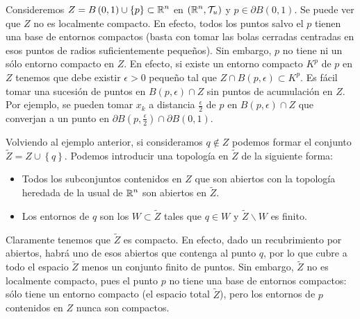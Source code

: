 \begin{eg}
	Consideremos $\displaystyle Z = B\left(0,1\right)\cup \left\{ p\right\}\subset \mathbb{R}^{n} $ en $\displaystyle \left(\mathbb{R}^{n}, \mathcal{T}_{u}\right) $ y $\displaystyle p \in \partial B\left(0,1\right) $. Se puede ver que $\displaystyle Z $ no es localmente compacto. En efecto, todos los puntos salvo el $\displaystyle p $ tienen una base de entornos compactos (basta con tomar las bolas cerradas centradas en esos puntos de radios suficientemente pequeños). Sin embargo, $\displaystyle p $ no tiene ni un sólo entorno compacto en $\displaystyle Z $. En efecto, si existe un entorno compacto $\displaystyle K^{p} $ de $\displaystyle p $ en $\displaystyle Z $ tenemos que debe existir $\displaystyle \epsilon > 0 $ pequeño tal que $\displaystyle Z \cap B\left(p,\epsilon \right)\subset K^{p} $. 
	Es fácil tomar una sucesión de puntos en $\displaystyle B\left(p, \epsilon \right)\cap Z $ sin puntos de acumulación en $\displaystyle Z $. Por ejemplo, se pueden tomar $\displaystyle x_{k} $ a distancia $\displaystyle \frac{\epsilon }{2} $ de $\displaystyle p $ en $\displaystyle B\left(p, \epsilon \right)\cap Z $ que converjan a un punto en $\displaystyle \partial B\left(p, \frac{\epsilon }{2}\right)\cap \partial B\left(0,1\right) $. 
\end{eg}
\begin{eg}
	Volviendo al ejemplo anterior, si consideramos $\displaystyle q \not\in Z $ podemos formar el conjunto $\displaystyle \tilde{Z} = Z \cup \left\{ q\right\}  $. Podemos introducir una topología en $\displaystyle \tilde{Z} $ de la siguiente forma: 
	\begin{itemize}
	\item Todos los subconjuntos contenidos en $\displaystyle Z $ que son abiertos con la topología heredada de la usual de $\displaystyle \mathbb{R}^{n} $ son abiertos en $\displaystyle \tilde{Z} $.
	\item Los entornos de $\displaystyle q $ son los $\displaystyle W \subset \tilde{Z} $ tales que $\displaystyle q \in W $ y $\displaystyle \tilde{Z}\backslash W $ es finito.
	\end{itemize}
	Claramente tenemos que $\displaystyle \tilde{Z} $ es compacto. En efecto, dado un recubrimiento por abiertos, habrá uno de esos abiertos que contenga al punto $\displaystyle q $, por lo que cubre a todo el espacio $\displaystyle \tilde{Z} $ menos un conjunto finito de puntos. 
	Sin embargo, $\displaystyle \tilde{Z} $ no es localmente compacto, pues el punto $\displaystyle p $ no tiene una base de entornos compactos: sólo tiene un entorno compacto (el espacio total $\displaystyle \tilde{Z} $), pero los entornos de $\displaystyle p $ contenidos en $\displaystyle Z $ nunca son compactos. 
\end{eg}
